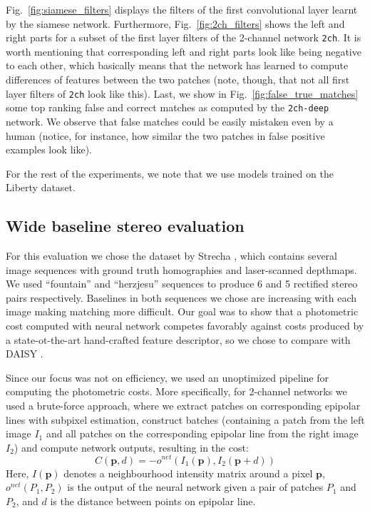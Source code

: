 \documentclass[10pt,twocolumn,letterpaper]{article}
\begin{document}
Fig.~\ref{fig:siamese_filters} displays the filters of the first convolutional layer learnt by the siamese network. Furthermore, Fig.~\ref{fig:2ch_filters} shows the left and right parts for a subset of the first layer filters of the 2-channel network \texttt{2ch}. It is worth mentioning that corresponding left and right parts look like being negative to each other, which basically means that the network has learned to  compute differences of features between the two patches 
(note, though, that not all first layer filters of \texttt{2ch}  look like this). Last, we show in Fig.~\ref{fig:false_true_matches} some top ranking false and  correct matches as computed by the \texttt{2ch-deep} network. We observe that false matches could be easily mistaken even by a human (notice, for instance, how similar the two patches in false positive examples look like).

 

%

For the rest of the experiments, we note that we use models trained on the Liberty dataset.
%


\subsection{Wide baseline stereo evaluation}

For this evaluation we chose the dataset by Strecha \etal\cite{StrechaDataset}, which contains several image sequences with ground truth homographies and 
laser-scanned depthmaps. We used ``fountain'' and ``herzjesu'' sequences to produce 6 and 5
rectified stereo pairs respectively. Baselines in both sequences we chose are 
increasing with each image making matching more difficult. Our goal was to show that 
a photometric cost computed with neural network competes favorably against costs produced
by a state-ot-the-art hand-crafted feature descriptor, so we chose to compare with DAISY \cite{Tola08}.

Since our focus was not on efficiency, we used an unoptimized pipeline for computing the photometric costs. More specifically,  for 2-channel networks we used a brute-force approach, where we extract patches on corresponding epipolar lines with subpixel estimation, construct
batches (containing a patch from the left image $I_1$ and all patches on the corresponding epipolar 
line from the right image $I_2$) and compute network outputs, resulting in the cost:
\begin{equation}
  C(\mathbf{p},d) =  - o^{net}(I_1(\mathbf{p}), I_2(\mathbf{p} + d))
  \label{eq:cnet}
\end{equation}
Here,  $I(\mathbf{p})$ denotes a neighbourhood intensity matrix around a pixel $\mathbf{p}$,
$o^{net}(P_1, P_2)$ is the output of the neural network given a pair of patches
$P_1$ and $P_2$, and $d$ is the  distance between points on epipolar line.
\end{document}
